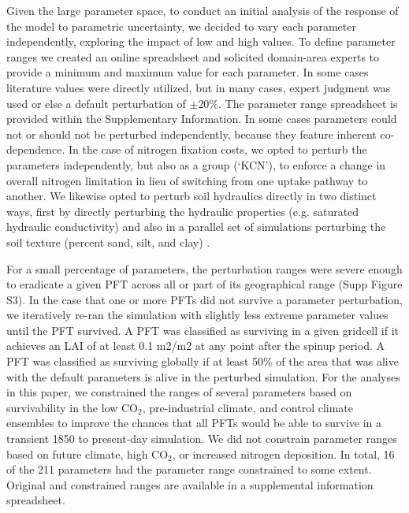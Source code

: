 \documentclass[draft]{agujournal2019}
\begin{document}
Given the large parameter space, to conduct an initial analysis of the response of the model to parametric uncertainty, we decided to vary each parameter independently, exploring the impact of low and high values. To define parameter ranges we created an online spreadsheet and solicited domain-area experts to provide a minimum and maximum value for each parameter. In some cases literature values were directly utilized, but in many cases, expert judgment was used or else a default perturbation of $\pm$20\%. The parameter range spreadsheet is provided within the Supplementary Information. In some cases parameters could not or should not be perturbed independently, because they feature inherent co-dependence. In the case of nitrogen fixation costs, we opted to perturb the parameters independently, but also as a group (`KCN'), to enforce a change in overall nitrogen limitation in lieu of switching from one uptake pathway to another. We likewise opted to perturb soil hydraulics directly in two distinct ways, first by directly perturbing the hydraulic properties (e.g. saturated hydraulic conductivity) and also  in a parallel set of simulations perturbing the soil texture (percent sand, silt, and clay) .

For a small percentage of parameters, the perturbation ranges were severe enough to eradicate a given PFT across all or part of its geographical range (Supp Figure S3). In the case that one or more PFTs did not survive a parameter perturbation, we iteratively re-ran the simulation with slightly less extreme parameter values until the PFT survived. A PFT was classified as surviving in a given gridcell if it achieves an LAI of at least 0.1 m2/m2 at any point after the spinup period. A PFT was classified as surviving globally if at least 50\% of the area that
was alive with the default parameters is alive in the perturbed simulation. For the analyses in this paper, we constrained the ranges of several parameters based on survivability in the low CO$_2$, pre-industrial climate, and control climate ensembles to improve the chances that all PFTs would be able to survive in a transient 1850 to present-day simulation. We did not constrain parameter ranges based on future climate, high CO$_2
$, or increased nitrogen deposition. In total, 16 of the 211 parameters had the parameter range constrained to some extent. Original and constrained ranges are available in a supplemental information spreadsheet.
\end{document}
